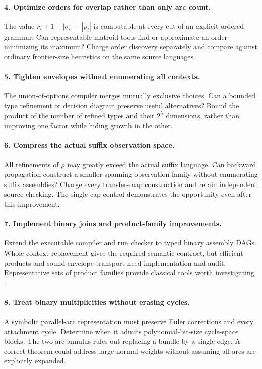 \documentclass[11pt,a4paper]{article}
\theoremstyle{definition}
\theoremstyle{remark}
\begin{document}
\paragraph{4. Optimize orders for overlap rather than only arc count.}
The value $r_i+1-|\sigma_i|-|\rho_i|$ is computable at every cut of an explicit ordered
grammar. Can representable-matroid tools find or approximate an order minimizing its
maximum? Charge order discovery separately and compare against ordinary frontier-size
heuristics on the same source languages.

\paragraph{5. Tighten envelopes without enumerating all contexts.}
The union-of-options compiler merges mutually exclusive choices. Can a bounded type
refinement or decision diagram preserve useful alternatives? Bound the product of the
number of refined types and their $2^\lambda$ dimensions, rather than improving one
factor while hiding growth in the other.

\paragraph{6. Compress the actual suffix observation space.}
All refinements of $\rho$ may greatly exceed the actual suffix language. Can backward
propagation construct a smaller spanning observation family without enumerating suffix
assemblies? Charge every transfer-map construction and retain independent source checking.
The single-cap control demonstrates the opportunity even after this improvement.

\paragraph{7. Implement binary joins and product-family improvements.}
Extend the executable compiler and run checker to typed binary assembly DAGs. Whole-context
replacement gives the required semantic contract, but efficient products and sound envelope
transport need implementation and audit. Representative sets of product families provide
classical tools worth investigating \cite{products}.

\paragraph{8. Treat binary multiplicities without erasing cycles.}
A symbolic parallel-arc representation must preserve Euler corrections and every attachment
cycle. Determine when it admits polynomial-bit-size cycle-space blocks. The two-arc annulus
rules out replacing a bundle by a single edge. A correct theorem could address large
normal weights without assuming all arcs are explicitly expanded.
\end{document}
